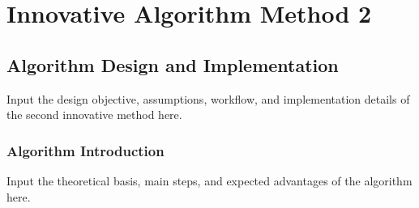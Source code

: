 \chapter{Innovative Algorithm Method 2}

\section{Algorithm Design and Implementation}
Input the design objective, assumptions, workflow, and implementation details of the second innovative method here.

\subsection{Algorithm Introduction}
Input the theoretical basis, main steps, and expected advantages of the algorithm here.
